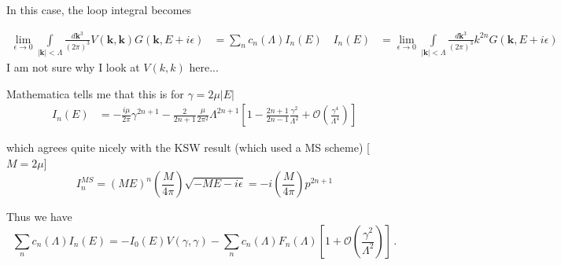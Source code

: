 \documentclass[
    aps,
    prl,
    showkeys,
    nofootinbib,
    floatfix
]{revtex4}
\renewcommand{\vec}[1]{\boldsymbol{#1}}
\begin{document}
In this case, the loop integral becomes

\begin{align}
	\lim\limits_{\epsilon \to 0}\int\limits_{|\vec k| < \Lambda}  \frac{d \vec k^3}{(2\pi)^3} V(\vec k, \vec k) G(\vec k, E + i \epsilon)
	&= \sum_n c_n (\Lambda) I_n(E) \, 
	&
	I_n(E) &= \lim\limits_{\epsilon \to 0}\int\limits_{|\vec k| < \Lambda}  \frac{d \vec k^3}{(2\pi)^3} k^{2 n} G(\vec k, E + i \epsilon)
\end{align}
I am not sure why I look at $V(k, k)$ here...

Mathematica tells me that this is for $\gamma = 2 \mu |E|$
\begin{align}
	I_n(E)
	&=
	-\frac{i\mu}{2\pi}\gamma^{2n + 1} 
		- \frac{2}{2n+1} \frac{\mu}{2 \pi^2}\Lambda^{2n+1}\left[1 - \frac{2n+1}{2n-1} \frac{\gamma^2}{\Lambda^2} + \mathcal O \left( \frac{\gamma^4}{\Lambda^4}\right)\right]
\end{align}

which agrees quite nicely with the KSW result (which used a MS scheme) [$M = 2 \mu$]
\begin{equation}
	I_{n}^{M S}=(M E)^{n}\left(\frac{M}{4 \pi}\right) \sqrt{-M E-i \epsilon}=-i\left(\frac{M}{4 \pi}\right) p^{2 n+1}
\end{equation}

Thus we have 
\begin{equation}
	\sum_n c_n (\Lambda) I_n(E)
	=
	-I_0(E) V(\gamma, \gamma)
	- \sum_n c_n(\Lambda) F_n(\Lambda) \left[ 1 + \mathcal O \left( \frac{\gamma^2}{\Lambda^2}\right) \right] \, .
\end{equation}
\end{document}
